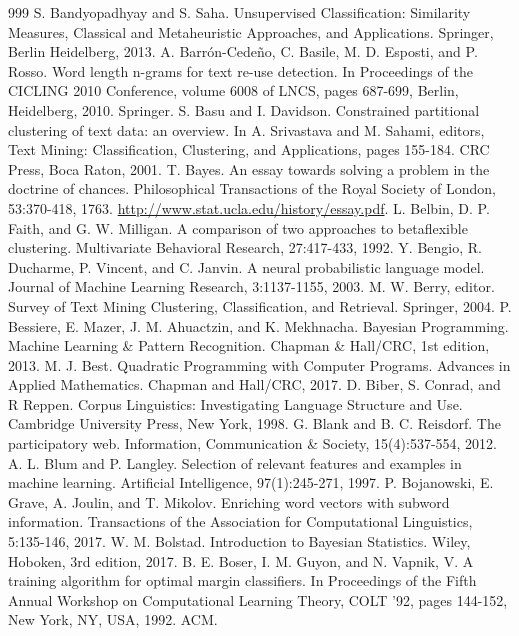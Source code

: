 \documentclass[11pt,openany,executivepaper]{book}
\begin{document}
\begin{thebibliography}{999}
 S. Bandyopadhyay and S. Saha. Unsupervised Classification: Similarity Measures, Classical and Metaheuristic Approaches, and Applications. Springer, Berlin Heidelberg, 2013.
 A. Barrón-Cedeño, C. Basile, M. D. Esposti, and P. Rosso. Word length n-grams for text re-use detection. In Proceedings of the CICLING 2010 Conference, volume 6008 of LNCS, pages 687-699, Berlin, Heidelberg, 2010. Springer.
 S. Basu and I. Davidson. Constrained partitional clustering of text data: an overview. In A. Srivastava and M. Sahami, editors, Text Mining: Classification, Clustering, and Applications, pages 155-184. CRC Press, Boca Raton, 2001.
 T. Bayes. An essay towards solving a problem in the doctrine of chances. Philosophical Transactions of the Royal Society of London, 53:370-418, 1763. \href{http://www.stat.ucla.edu/history/essay.pdf}{http://www.stat.ucla.edu/history/essay.pdf}.
 L. Belbin, D. P. Faith, and G. W. Milligan. A comparison of two approaches to betaflexible clustering. Multivariate Behavioral Research, 27:417-433, 1992.
 Y. Bengio, R. Ducharme, P. Vincent, and C. Janvin. A neural probabilistic language model. Journal of Machine Learning Research, 3:1137-1155, 2003.
 M. W. Berry, editor. Survey of Text Mining Clustering, Classification, and Retrieval. Springer, 2004.
 P. Bessiere, E. Mazer, J. M. Ahuactzin, and K. Mekhnacha. Bayesian Programming. Machine Learning \& Pattern Recognition. Chapman \& Hall/CRC, 1st edition, 2013.
 M. J. Best. Quadratic Programming with Computer Programs. Advances in Applied Mathematics. Chapman and Hall/CRC, 2017.
 D. Biber, S. Conrad, and R Reppen. Corpus Linguistics: Investigating Language Structure and Use. Cambridge University Press, New York, 1998.
 G. Blank and B. C. Reisdorf. The participatory web. Information, Communication \& Society, 15(4):537-554, 2012.
 A. L. Blum and P. Langley. Selection of relevant features and examples in machine learning. Artificial Intelligence, 97(1):245-271, 1997.
 P. Bojanowski, E. Grave, A. Joulin, and T. Mikolov. Enriching word vectors with subword information. Transactions of the Association for Computational Linguistics, 5:135-146, 2017.
 W. M. Bolstad. Introduction to Bayesian Statistics. Wiley, Hoboken, 3rd edition, 2017.
 B. E. Boser, I. M. Guyon, and N. Vapnik, V. A training algorithm for optimal margin classifiers. In Proceedings of the Fifth Annual Workshop on Computational Learning Theory, COLT '92, pages 144-152, New York, NY, USA, 1992. ACM.

\end{thebibliography}
\end{document}
